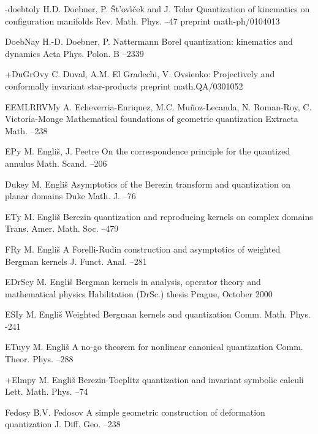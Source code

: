 \documentclass[11pt]{amsart}
\numberwithin{equation}{section}
\theoremstyle{remark}
\newcommand{\by}{\mathbf y}
\begin{document}
\begin{thebibliography}{199}
 -doebtol\by{ H.D. Doebner, P. \v{S}t\!'ov{\'\i}\v{c}ek and J. Tolar
\paper Quantization of kinematics on configuration manifolds \jour Rev. Math.
Phys.   --47 \paperinfo preprint math-ph/0104013}

 DoebNa\by{ H.-D. Doebner, P. Nattermann \paper Borel quantization:
kinematics and dynamics \jour Acta Phys. Polon. B   --2339}

 +DuGrOv\by{ C. Duval, A.M. El Gradechi, V. Ovsienko: Projectively and
conformally invariant star-products \paperinfo preprint math.QA/0301052}

 EEMLRRVM\by{ A. Echeverria-Enriquez, M.C. Mu\~noz-Lecanda, N. Roman-Roy,
C. Victoria-Monge \paper Mathematical foundations of geometric quantization
\jour Extracta Math.   --238}

 EP\by{ M. Engli\v s, J. Peetre \paper On the correspondence principle for
the quantized annulus \jour Math. Scand.   --206}

 Duke\by{ M. Engli\v s \paper Asymptotics of the Berezin transform and
quantization on planar domains \jour Duke Math. J.  --76}

 ET\by{ M. Engli\v s \paper Berezin quantization and reproducing kernels
on complex domains \jour Trans. Amer. Math. Soc.  --479}

 FR\by{ M. Engli\v s \paper A Forelli-Rudin construction and asymptotics
of weighted Bergman kernels \jour J. Funct. Anal.   --281}

 EDrSc\by{ M. Engli\v s \paper Bergman kernels in analysis, operator
theory and mathematical physics \paperinfo Habilitation (DrSc.) thesis
\publaddr Prague, October 2000}

 ESI\by{ M. Engli\v s \paper Weighted Bergman kernels and quantization
\jour Comm. Math. Phys.   -241}

 ETuy\by{ M. Engli\v s \paper A no-go theorem for nonlinear canonical
quantization \jour Comm. Theor. Phys.   --288}

 +Elmp\by{ M. Engli\v s \paper Berezin-Toeplitz quantization and invariant
symbolic calculi \jour Lett. Math. Phys.   --74}

 Fedos\by{ B.V. Fedosov \paper A simple geometric construction of
deformation quantization \jour J. Diff. Geo.   --238}


\end{thebibliography}
\end{document}
